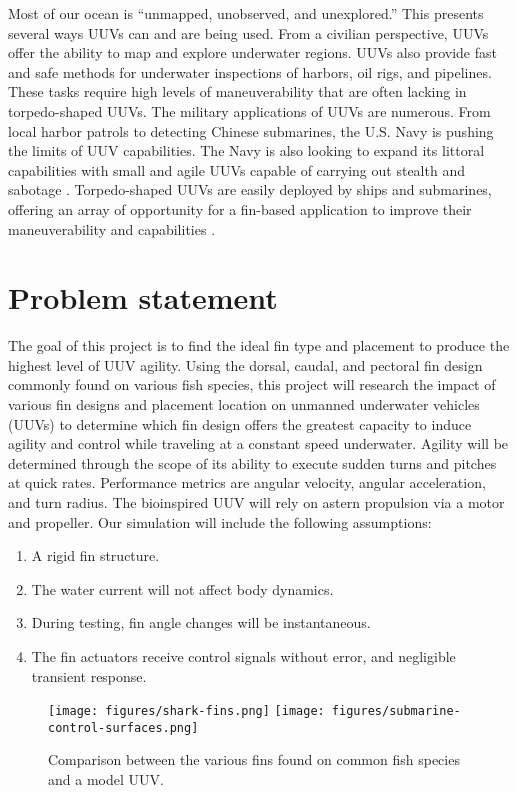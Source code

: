 \documentclass{IEEEtran}
\begin{document}
Most of our ocean is “unmapped, unobserved, and unexplored.” \cite{noaa2009how} This presents several ways UUVs can and are being used. From a civilian perspective, UUVs offer the ability to map and explore underwater regions. UUVs also provide fast and safe methods for underwater inspections of harbors, oil rigs, and pipelines.\cite{maslin2020raising} These tasks require high levels of maneuverability that are often lacking in torpedo-shaped UUVs. The military applications of UUVs are numerous. From local harbor patrols to detecting Chinese submarines, the U.S. Navy is pushing the limits of UUV capabilities. The Navy is also looking to expand its littoral capabilities with small and agile UUVs capable of carrying out stealth and sabotage \cite{berenice2018splash}. Torpedo-shaped UUVs are easily deployed by ships and submarines, offering an array of opportunity for a fin-based application to improve their maneuverability and capabilities \cite{orourke2020navy}.





\section{Problem statement}
The goal of this project is to find the ideal fin type and placement to produce the highest level of UUV agility. Using the dorsal, caudal, and pectoral fin design commonly found on various fish species, this project will research the impact of various fin designs and placement location on unmanned underwater vehicles (UUVs) to determine which fin design offers the greatest capacity to induce agility and control while traveling at a constant speed underwater. Agility will be determined through the scope of its ability to execute sudden turns and pitches at quick rates. Performance metrics are angular velocity, angular acceleration, and turn radius. The bioinspired UUV will rely on astern propulsion via a motor and propeller. Our simulation will include the following assumptions:
\begin{enumerate}
\item A rigid fin structure.
\item The water current will not affect body dynamics.
\item During testing, fin angle changes will be instantaneous.
\item The fin actuators receive control signals without error, and negligible transient response.
\end{enumerate}
\begin{figure*}
\begin{center}
\texttt{[image: figures/shark-fins.png]}
\texttt{[image: figures/submarine-control-surfaces.png]}
\end{center}
\caption{Comparison between the various fins found on common fish species and a model UUV.}
\label{fig:3}
\end{figure*}
\end{document}
